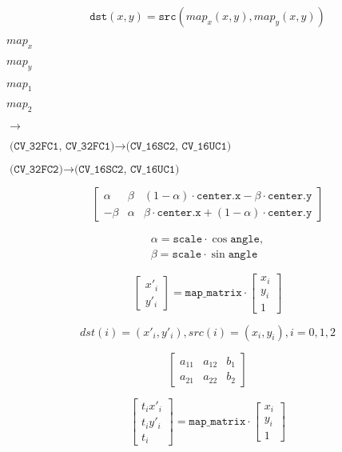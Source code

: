 \documentclass{article}
\begin{document}
\[\texttt{dst} (x,y) = \texttt{src} (map_x(x,y),map_y(x,y))\]
\pagebreak

$map_x$
\pagebreak

$map_y$
\pagebreak

$map_1$
\pagebreak

$map_2$
\pagebreak

$\rightarrow$
\pagebreak

$\texttt{(CV_32FC1, CV_32FC1)} \rightarrow \texttt{(CV_16SC2, CV_16UC1)}$
\pagebreak

$\texttt{(CV_32FC2)} \rightarrow \texttt{(CV_16SC2, CV_16UC1)}$
\pagebreak

\[\begin{bmatrix} \alpha & \beta & (1- \alpha ) \cdot \texttt{center.x} - \beta \cdot \texttt{center.y} \\ - \beta & \alpha & \beta \cdot \texttt{center.x} + (1- \alpha ) \cdot \texttt{center.y} \end{bmatrix}\]
\pagebreak

\[\begin{array}{l} \alpha = \texttt{scale} \cdot \cos \texttt{angle} , \\ \beta = \texttt{scale} \cdot \sin \texttt{angle} \end{array}\]
\pagebreak

\[\begin{bmatrix} x'_i \\ y'_i \end{bmatrix} = \texttt{map_matrix} \cdot \begin{bmatrix} x_i \\ y_i \\ 1 \end{bmatrix}\]
\pagebreak

\[dst(i)=(x'_i,y'_i), src(i)=(x_i, y_i), i=0,1,2\]
\pagebreak

\[\begin{bmatrix} a_{11} & a_{12} & b_1 \\ a_{21} & a_{22} & b_2 \end{bmatrix}\]
\pagebreak

\[\begin{bmatrix} t_i x'_i \\ t_i y'_i \\ t_i \end{bmatrix} = \texttt{map_matrix} \cdot \begin{bmatrix} x_i \\ y_i \\ 1 \end{bmatrix}\]
\pagebreak
\end{document}
